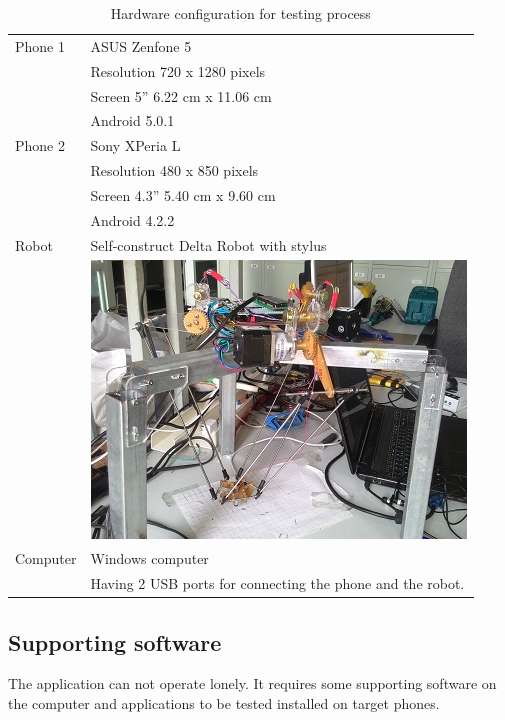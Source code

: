 \begin{table}[H]
	\centering
	\caption{Hardware configuration for testing process}	
	\label{tab:hw}
	\begin{tabularx}{0.65\textwidth}{ll}
		\toprule
		Phone 1 & ASUS Zenfone 5 \\
			  & Resolution 720 x 1280 pixels \\
			  & Screen 5'' 6.22 cm x 11.06 cm \\
			  & Android 5.0.1\\
		\midrule 
		Phone 2 & Sony XPeria L \\
			  & Resolution 480 x 850 pixels \\
			  & Screen 4.3'' 5.40 cm x 9.60 cm \\
			  & Android 4.2.2\\
		\midrule 
		Robot & Self-construct Delta Robot with stylus \\
			  & \begin{minipage}{0.7\linewidth}
			\includegraphics[width=0.8\linewidth]{Chapters/Fig/delta_robot.jpg}
		\end{minipage} \\
		\midrule 
		Computer & Windows computer \\
				 & Having 2 USB ports for connecting the phone and the robot. \\
		\bottomrule
	\end{tabularx}
\end{table}

\subsection{Supporting software}
The application can not operate lonely. It requires some supporting software on the computer and applications to be tested installed on target phones.

